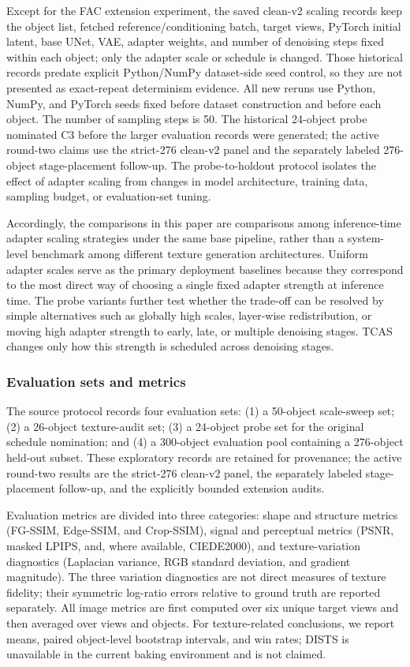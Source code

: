 \documentclass[times,twocolumn,final]{elsarticle}
\begin{document}
Except for the FAC extension experiment, the saved clean-v2 scaling records keep the object list, fetched reference/conditioning batch, target views, PyTorch initial latent, base UNet, VAE, adapter weights, and number of denoising steps fixed within each object; only the adapter scale or schedule is changed. Those historical records predate explicit Python/NumPy dataset-side seed control, so they are not presented as exact-repeat determinism evidence. All new reruns use Python, NumPy, and PyTorch seeds fixed before dataset construction and before each object. The number of sampling steps is 50. The historical 24-object probe nominated C3 before the larger evaluation records were generated; the active round-two claims use the strict-276 clean-v2 panel and the separately labeled 276-object stage-placement follow-up. The probe-to-holdout protocol isolates the effect of adapter scaling from changes in model architecture, training data, sampling budget, or evaluation-set tuning.

Accordingly, the comparisons in this paper are comparisons among inference-time adapter scaling strategies under the same base pipeline, rather than a system-level benchmark among different texture generation architectures. Uniform adapter scales serve as the primary deployment baselines because they correspond to the most direct way of choosing a single fixed adapter strength at inference time. The probe variants further test whether the trade-off can be resolved by simple alternatives such as globally high scales, layer-wise redistribution, or moving high adapter strength to early, late, or multiple denoising stages. TCAS changes only how this strength is scheduled across denoising stages.

\subsubsection{Evaluation sets and metrics}

The source protocol records four evaluation sets: (1) a 50-object scale-sweep set; (2) a 26-object texture-audit set; (3) a 24-object probe set for the original schedule nomination; and (4) a 300-object evaluation pool containing a 276-object held-out subset. These exploratory records are retained for provenance; the active round-two results are the strict-276 clean-v2 panel, the separately labeled stage-placement follow-up, and the explicitly bounded extension audits.

Evaluation metrics are divided into three categories: shape and structure metrics (FG-SSIM, Edge-SSIM, and Crop-SSIM), signal and perceptual metrics (PSNR, masked LPIPS, and, where available, CIEDE2000), and texture-variation diagnostics (Laplacian variance, RGB standard deviation, and gradient magnitude). The three variation diagnostics are not direct measures of texture fidelity; their symmetric log-ratio errors relative to ground truth are reported separately. All image metrics are first computed over six unique target views and then averaged over views and objects. For texture-related conclusions, we report means, paired object-level bootstrap intervals, and win rates; DISTS is unavailable in the current baking environment and is not claimed.
\end{document}
